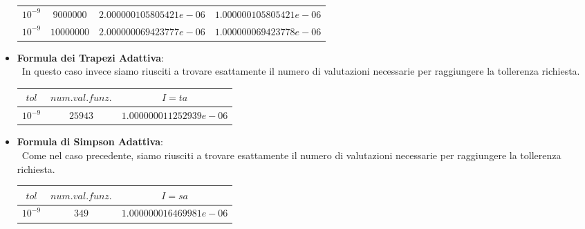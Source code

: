 \begin{itemize}
\begin{center}
\begin{tabular}{|c|c|c|c|}
						$10^{-9}$ & $9000000$ & $2.000000105805421e-06$ & $1.000000105805421e-06$ \\
						$10^{-9}$ & $10000000$ & $2.000000069423777e-06$ & $1.000000069423778e-06$ \\
					\hline
			\end{tabular}
			\end{center}
	\item
		\textbf{Formula dei Trapezi Adattiva}:\\\
			In questo caso invece siamo riusciti a trovare esattamente il numero di valutazioni necessarie per raggiungere la tollerenza richiesta.
			\begin{center}
			\begin{tabular}{|c|c|c|}
				\hline
					$tol$ & $num. val. funz.$ & $I=ta$ \\
    				\hline
    					$10^{-9}$ & $25943$ & $1.000000011252939e-06$ \\
				\hline
			\end{tabular}
			\end{center}
	\item
		\textbf{Formula di Simpson Adattiva}:\\\
			Come nel caso precedente, siamo riusciti a trovare esattamente il numero di valutazioni necessarie per raggiungere la tollerenza richiesta.
			\begin{center}
			\begin{tabular}{|c|c|c|}
				\hline
					$tol$ & $num. val. funz.$ & $I=sa$ \\
    				\hline
    					$10^{-9}$ & $349$ & $1.000000016469981e-06$ \\
					\hline
			\end{tabular}
			\end{center}
\end{itemize}